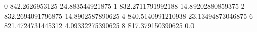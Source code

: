 0 842.2626953125 24.883544921875
1 832.2711791992188 14.89202880859375
2 832.2694091796875 14.8902587890625
4 840.5140991210938 23.13494873046875
6 821.4724731445312 4.09332275390625
8 817.379150390625 0.0
